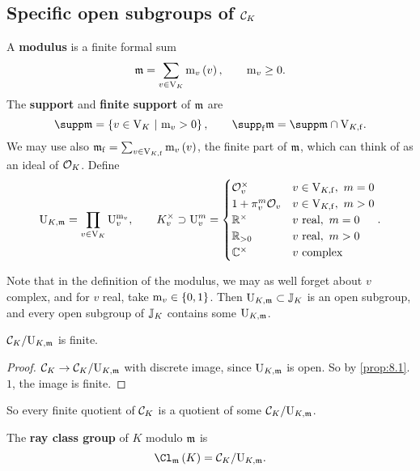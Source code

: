 \pagebreak

\subsection{Specific open subgroups of \texorpdfstring{$ \mathcal{C}_K $}{idele class group}}

\begin{definition*}
A \textbf{modulus} is a finite formal sum
$$ \mmm = \sum_{v \in \V_K} \m_v\br{v}, \qquad \m_v \ge 0. $$
The \textbf{support} and \textbf{finite support} of $ \mathfrak{m} $ are
$$ \supp \mmm = \cbr{v \in \V_K \st \m_v > 0}, \qquad \supp_\f \mmm = \supp \mmm \cap \V_{K, \f}. $$
We may use also $ \mmm_\f = \sum_{v \in \V_{K, \f}} \m_v\br{v} $, the finite part of $ \mathfrak{m} $, which can think of as an ideal of $ \mathcal{O}_K $. Define
$$ \mathrm{U}_{K, \mathfrak{m}} = \prod_{v \in \mathrm{V}_K} \mathrm{U}_v^{\mathrm{m}_v}, \qquad K_v^\times \supset \mathrm{U}_v^m =
\begin{cases}
\mathcal{O}_v^\times & v \in \mathrm{V}_{K, \mathrm{f}}, \ m = 0 \\
1 + \pi_v^m\mathcal{O}_v & v \in \mathrm{V}_{K, \mathrm{f}}, \ m > 0 \\
\mathbb{R}^\times & v \ \text{real}, \ m = 0 \\
\mathbb{R}_{> 0} & v \ \text{real}, \ m > 0 \\
\mathbb{C}^\times & v \ \text{complex}
\end{cases}.
$$
\end{definition*}

Note that in the definition of the modulus, we may as well forget about $ v $ complex, and for $ v $ real, take $ \m_v \in \cbr{0, 1} $. Then $ \mathrm{U}_{K, \mathfrak{m}} \subset \mathbb{J}_K $ is an open subgroup, and every open subgroup of $ \mathbb{J}_K $ contains some $ \mathrm{U}_{K, \mathfrak{m}} $.

\begin{proposition}
$ \mathcal{C}_K / \mathrm{U}_{K, \mathfrak{m}} $ is finite.
\end{proposition}

\begin{proof}
$ \mathcal{C}_K \to \mathcal{C}_K / \mathrm{U}_{K, \mathfrak{m}} $ with discrete image, since $ \mathrm{U}_{K, \mathfrak{m}} $ is open. So by \ref{prop:8.1}.$ 1 $, the image is finite.
\end{proof}

So every finite quotient of $ \mathcal{C}_K $ is a quotient of some $ \mathcal{C}_K / \mathrm{U}_{K, \mathfrak{m}} $.

\begin{definition*}
The \textbf{ray class group} of $ K $ modulo $ \mathfrak{m} $ is
$$ \Cl_\mmm\br{K} = \CCC_K / \U_{K, \mmm}. $$
\end{definition*}

